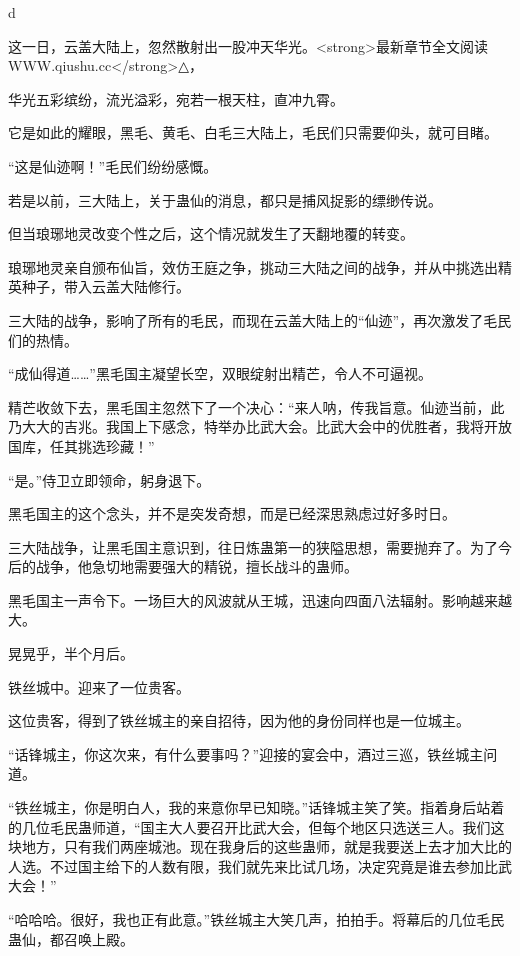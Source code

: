
\begin{this_body}

d

这一日，云盖大陆上，忽然散射出一股冲天华光。<strong>最新章节全文阅读WWW.qiushu.cc</strong>△，

华光五彩缤纷，流光溢彩，宛若一根天柱，直冲九霄。

它是如此的耀眼，黑毛、黄毛、白毛三大陆上，毛民们只需要仰头，就可目睹。

“这是仙迹啊！”毛民们纷纷感慨。

若是以前，三大陆上，关于蛊仙的消息，都只是捕风捉影的缥缈传说。

但当琅琊地灵改变个性之后，这个情况就发生了天翻地覆的转变。

琅琊地灵亲自颁布仙旨，效仿王庭之争，挑动三大陆之间的战争，并从中挑选出精英种子，带入云盖大陆修行。

三大陆的战争，影响了所有的毛民，而现在云盖大陆上的“仙迹”，再次激发了毛民们的热情。

“成仙得道……”黑毛国主凝望长空，双眼绽射出精芒，令人不可逼视。

精芒收敛下去，黑毛国主忽然下了一个决心：“来人呐，传我旨意。仙迹当前，此乃大大的吉兆。我国上下感念，特举办比武大会。比武大会中的优胜者，我将开放国库，任其挑选珍藏！”

“是。”侍卫立即领命，躬身退下。

黑毛国主的这个念头，并不是突发奇想，而是已经深思熟虑过好多时日。

三大陆战争，让黑毛国主意识到，往日炼蛊第一的狭隘思想，需要抛弃了。为了今后的战争，他急切地需要强大的精锐，擅长战斗的蛊师。

黑毛国主一声令下。一场巨大的风波就从王城，迅速向四面八法辐射。影响越来越大。

晃晃乎，半个月后。

铁丝城中。迎来了一位贵客。

这位贵客，得到了铁丝城主的亲自招待，因为他的身份同样也是一位城主。

“话锋城主，你这次来，有什么要事吗？”迎接的宴会中，酒过三巡，铁丝城主问道。

“铁丝城主，你是明白人，我的来意你早已知晓。”话锋城主笑了笑。指着身后站着的几位毛民蛊师道，“国主大人要召开比武大会，但每个地区只选送三人。我们这块地方，只有我们两座城池。现在我身后的这些蛊师，就是我要送上去才加大比的人选。不过国主给下的人数有限，我们就先来比试几场，决定究竟是谁去参加比武大会！”

“哈哈哈。很好，我也正有此意。”铁丝城主大笑几声，拍拍手。将幕后的几位毛民蛊仙，都召唤上殿。


\end{this_body}
